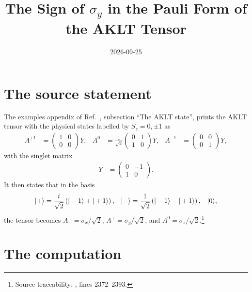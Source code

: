 \documentclass{article}
\title{The Sign of $\sigma_y$ in the Pauli Form of the AKLT Tensor}
\author{}
\date{2026-09-25}
\begin{document}
\maketitle
{}

\section{The source statement}

The examples appendix of Ref.~\cite{Cirac2021Matrix}, subsection ``The AKLT
state'', prints the AKLT tensor with the physical states labelled by
$S_z=0,\pm1$ as
\begin{align}
    A^{+1}
        &=\begin{pmatrix}1&0\\0&0\end{pmatrix}Y,
    &
    A^{0}
        &=\frac{1}{\sqrt2}\begin{pmatrix}0&1\\1&0\end{pmatrix}Y,
    &
    A^{-1}
        &=\begin{pmatrix}0&0\\0&1\end{pmatrix}Y,
    \label{eq:rmp_aklt_pauli_basis_sign_tensor}
\end{align}
with the singlet matrix
\begin{align}
    Y
        &=\begin{pmatrix}0&-1\\1&0\end{pmatrix}.
    \label{eq:rmp_aklt_pauli_basis_sign_singlet}
\end{align}
It then states that in the basis
\begin{align}
    |+\rangle
        &=\frac{i}{\sqrt2}\left(|-1\rangle+|+1\rangle\right),
    &
    |-\rangle
        &=\frac{1}{\sqrt2}\left(|-1\rangle-|+1\rangle\right),
    &
    |0\rangle,
    \label{eq:rmp_aklt_pauli_basis_sign_basis}
\end{align}
the tensor becomes $A^-=\sigma_x/\sqrt2$, $A^+=\sigma_y/\sqrt2$, and
$A^0=\sigma_z/\sqrt2$.\footnote{Source traceability:
, lines 2372--2393.}

\section{The computation}
\end{document}
